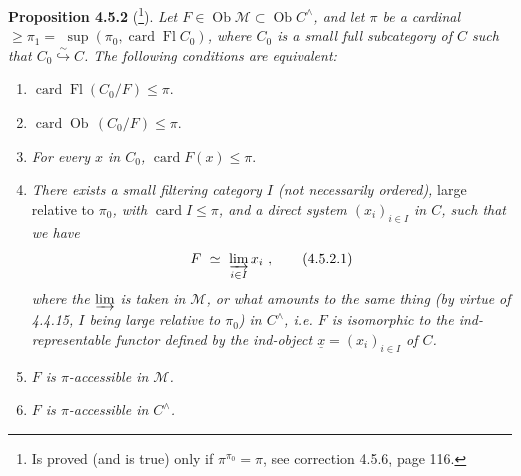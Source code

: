 \documentclass[11pt]{article}
\newcommand{\msp}[1]{\marginpar{\footnotesize [#1]}}
\newcommand{\card}{\operatorname{card}}
\newcommand{\Fl}{\operatorname{Fl}}
\newcommand{\Ob}{\operatorname{Ob}}
\begin{document}
\textbf{Proposition 4.5.2} (\footnote{Is proved (and is true) only if $\pi^{\pi_0} = \pi$, see correction 4.5.6, page 116.}). \textit{Let $F \in \Ob\mathcal{M} \subset \Ob C^{\wedge}$, and let $\pi$ be a cardinal $\geqslant \pi_1 =$} $\sup(\pi_0, \card\Fl C_0)$\textit{, where $C_0$ is a small full subcategory of $C$ such that $C_0 \overset{\sim}{\hookrightarrow} C$. The following conditions are equivalent:}
\begin{enumerate}[leftmargin=3em]
\item[\textit{a)}] $\card\Fl(C_0/F) \leqslant \pi$.
\item[\textit{a$'$)}] $\card\Ob\,(C_0/F) \leqslant \pi$.
\item[\textit{a$''$)}] \textit{For every $x$ in $C_0$,} $\card F(x) \leqslant \pi$.
\item[\textit{b)}] \textit{There exists a small filtering category $I$ (not necessarily ordered),} large relative to $\pi_0$\textit{, with} $\card I \leqslant \pi$\textit{, and a direct system $(x_i)_{i\in I}$ in $C$, such that we have}
\[
F \ \simeq\ \varinjlim_{i\in I} x_i\ ,
\tag*{(4.5.2.1)}
\]
\textit{where the $\varinjlim$ is taken in $\mathcal{M}$, or what amounts to the same thing (by virtue of 4.4.15, $I$ being large relative to $\pi_0$) in $C^{\wedge}$, i.e. $F$ is isomorphic to the ind-representable functor defined by the ind-object $\underline{x} = (x_i)_{i\in I}$ of $C$.}
\item[\textit{c)}] \textit{$F$ is $\pi$-accessible in $\mathcal{M}$.}
\item[\textit{c$'$)}] \textit{$F$ is $\pi$-accessible in $C^{\wedge}$.}
\end{enumerate}
\msp{page 108}
\end{document}

